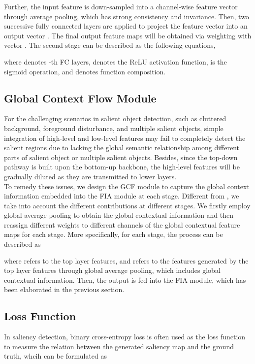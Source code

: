 \documentclass[letterpaper]{article} \usepackage{aaai20}  \usepackage{times}  \usepackage{helvet} \usepackage{courier}  \usepackage[hyphens]{url}  \usepackage{graphicx} \urlstyle{rm} \def\UrlFont{\rm}  \usepackage{graphicx}  \frenchspacing  \setlength{\pdfpagewidth}{8.5in}  \setlength{\pdfpageheight}{11in}
\begin{document}
\indent Further, the input feature  is down-sampled into
a channel-wise feature vector  through average pooling, which has strong consistency and invariance.
Then, two successive fully connected layers  are applied to 
project the feature vector  into an output vector .
The final output feature maps  will be obtained via weighting with vector .
The second stage can be described as the following equations,

where  denotes -th FC layers,  denotes the ReLU activation function,  is the sigmoid operation,
and  denotes function composition.
\subsection{Global Context Flow Module}
For the challenging scenarios in salient object detection, such as cluttered background, foreground disturbance, and multiple salient objects, simple integration of high-level and low-level features may fail to completely detect the salient regions due to lacking the global semantic relationship among different parts of salient object or multiple salient objects. 
Besides, since the top-down pathway is built upon the bottom-up backbone, the high-level features will be gradually diluted as they are transmitted to lower layers.  \\
\indent To remedy these issues, we design the GCF module to capture the global context information embedded into the FIA module at each stage.
Different from \cite{liu2019simple}, we take into account the different contributions at different stages.
We firstly employ global average pooling \cite{lin2013network} to obtain the global contextual information and then reassign different weights to different channels of the global contextual feature maps for each stage.
More specifically, for each stage, the process can be described as 

where  refers to the top layer features, and  refers to the features generated by the top layer features through global average pooling, which includes global contextual information. Then, the output  is fed into the FIA module, which has been elaborated in the previous section.
\subsection{Loss Function}
In saliency detection, binary cross-entropy loss is often used as the loss function to measure the relation between the generated saliency map and 
the ground truth, whcih can be formulated as
\end{document}
